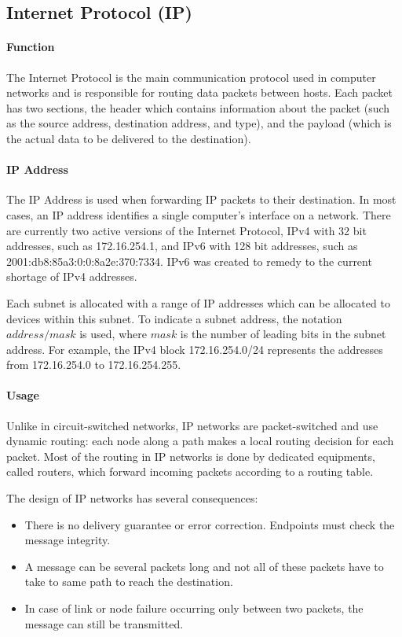 \subsection{Internet Protocol (IP)}
\paragraph{Function}
The Internet Protocol is the main communication protocol used in computer networks and is responsible for routing data packets between hosts. Each packet has two sections, the header which contains information about the packet (such as the source address, destination address, and type), and the payload (which is the actual data to be delivered to the destination)\cite{rfc791}.

\paragraph{IP Address}
The IP Address is used when forwarding IP packets to their destination. In most cases, an IP address identifies a single computer's interface on a network.
There are currently two active versions of the Internet Protocol, IPv4 with 32 bit addresses, such as 172.16.254.1\cite{rfc791}, and IPv6 with 128 bit addresses, such as 2001:db8:85a3:0:0:8a2e:370:7334. IPv6 was created to remedy to the current shortage of IPv4 addresses\cite{rfc2460}.

Each subnet is allocated with a range of IP addresses which can be allocated to devices within this subnet. To indicate a subnet address, the notation $address/mask$ is used, where $mask$ is the number of leading bits in the subnet address.
For example, the IPv4 block 172.16.254.0/24 represents the addresses from 172.16.254.0 to 172.16.254.255.

\paragraph{Usage}
Unlike in circuit-switched networks, IP networks are packet-switched and use dynamic routing: each node along a path makes a local routing decision for each packet. Most of the routing in IP networks is done by dedicated equipments, called routers, which forward incoming packets according to a routing table.

The design of IP networks has several consequences:
\begin{itemize}
\item There is no delivery guarantee or error correction. Endpoints must check the message integrity.
\item A message can be several packets long and not all of these packets have to take to same path to reach the destination.
\item In case of link or node failure occurring only between two packets, the message can still be transmitted.
\end{itemize}


